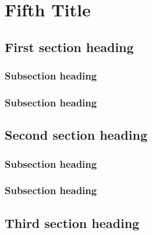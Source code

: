 \chapter[\DTMusedate{entry}]{Fifth Title}

\section{First section heading}
\lipsum[1]

\subsection{Subsection heading}
\lipsum[1-2]

\subsection{Subsection heading}
\lipsum[1-2]

\section{Second section heading}
\lipsum[3-5]

\subsection{Subsection heading}
\lipsum[1-2]

\subsection{Subsection heading}
\lipsum[1-2]

\section{Third section heading}
\lipsum[1]